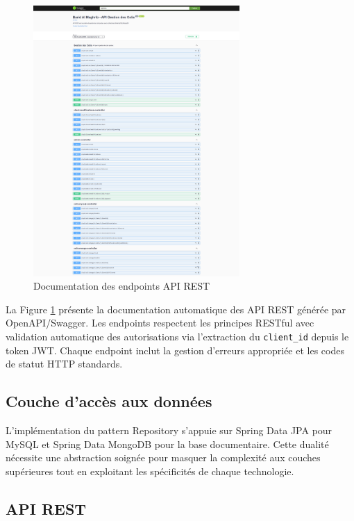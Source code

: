 \begin{figure}[H]
\centering
\includegraphics[width=0.7\textwidth]{images/api_endpoints.png}
\caption{Documentation des endpoints API REST}
\label{fig:api_endpoints}
\end{figure}

La Figure \ref{fig:api_endpoints} présente la documentation automatique des API REST générée par OpenAPI/Swagger. Les endpoints respectent les principes RESTful avec validation automatique des autorisations via l'extraction du \texttt{client\_id} depuis le token JWT. Chaque endpoint inclut la gestion d'erreurs appropriée et les codes de statut HTTP standards.

\subsection{Couche d'accès aux données}

L'implémentation du pattern Repository s'appuie sur Spring Data JPA pour MySQL et Spring Data MongoDB pour la base documentaire. Cette dualité nécessite une abstraction soignée pour masquer la complexité aux couches supérieures tout en exploitant les spécificités de chaque technologie.

\subsection{API REST}

